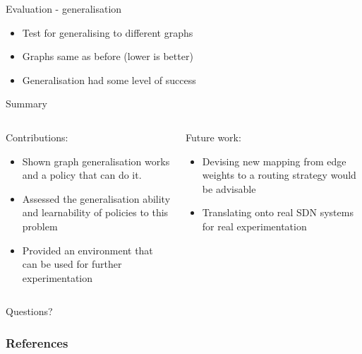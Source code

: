 \documentclass{beamer}
\begin{document}
\begin{frame}{Evaluation - generalisation}
  \begin{itemize}
    \item Test for generalising to different graphs
    \item Graphs same as before (lower is better)
    \item Generalisation had some level of success
  \end{itemize}
  \centering
  \resizebox{0.7\textwidth}{!}{}
\end{frame}

\begin{frame}{Summary}
\begin{columns}
  \begin{column}{0.5\textwidth}
    Contributions:
    \begin{itemize}
      \item Shown graph generalisation works and a policy that can do it.
      \item Assessed the generalisation ability and learnability of policies to this problem
      \item Provided an environment that can be used for further experimentation
    \end{itemize}
  \end{column}
  \begin{column}{0.5\textwidth}
    Future work:
    \begin{itemize}
      \item Devising new mapping from edge weights to a routing strategy would be advisable
      \item Translating onto real SDN systems for real experimentation
    \end{itemize}
    \vspace{3\baselineskip}
  \end{column}
\end{columns}
\end{frame}

\begin{frame}
\begin{center}
\textcolor{CBlue}{\Huge Questions?}
\end{center}
\end{frame}

\begin{frame}[allowframebreaks]
    \footnotesize
    \frametitle{References}
    \printbibliography
\end{frame}
\end{document}
